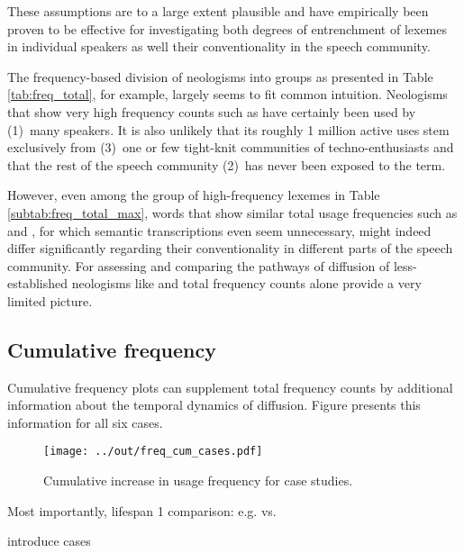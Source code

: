 \documentclass[draft, a4paper, abstract=on]{scrartcl}
\begin{document}
These assumptions are to a large extent plausible and have empirically been proven to be effective for investigating both degrees of entrenchment of lexemes in individual speakers as well their conventionality in the speech community.

The frequency-based division of neologisms into groups as presented in Table \ref{tab:freq_total}, for example, largely seems to fit common intuition. Neologisms that show very high frequency counts such as  have certainly been used by (1)~many speakers. It is also unlikely that its roughly 1 million active uses stem exclusively from (3)~one or few tight-knit communities of techno-enthusiasts and that the rest of the speech community (2)~has never been exposed to the term.

However, even among the group of high-frequency lexemes in Table \ref{subtab:freq_total_max}, words that show similar total usage frequencies such as  and , for which semantic transcriptions even seem unnecessary, might indeed differ significantly regarding their conventionality in different parts of the speech community. For assessing and comparing the pathways of diffusion of less-established neologisms like  and  total frequency counts alone provide a very limited picture.

  \subsection{Cumulative frequency}

Cumulative frequency plots can supplement total frequency counts by additional information about the temporal dynamics of diffusion. Figure presents this information for all six cases.

\begin{figure}
\caption{Cumulative increase in usage frequency for case studies.\protect\footnotemark}
\label{fig:freq_cum_cases}
\texttt{[image: ../out/freq\_cum\_cases.pdf]}
\centering
\end{figure}

Most importantly,
lifespan
1 comparison: e.g.  vs. 

introduce cases
\end{document}
